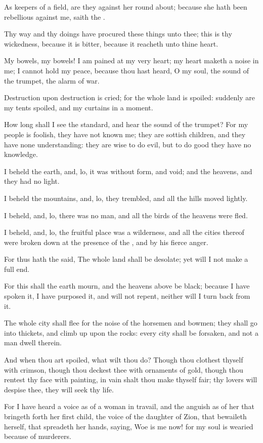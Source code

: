 \Verse As keepers of a field, are they against her round about; because she hath been rebellious against me, saith the \LORD.

\Verse Thy way and thy doings have procured these things unto thee; this is thy wickedness, because it is bitter, because it reacheth unto thine heart.

\Verse My bowels, my bowels! I am pained at my very heart; my heart maketh a noise in me; I cannot hold my peace, because thou hast heard, O my soul, the sound of the trumpet, the alarm of war.

\Verse Destruction upon destruction is cried; for the whole land is spoiled: suddenly are my tents spoiled, and my curtains in a moment.

\Verse How long shall I see the standard, and hear the sound of the trumpet?  \Verse For my people is foolish, they have not known me; they are sottish children, and they have none understanding: they are wise to do evil, but to do good they have no knowledge.

\Verse I beheld the earth, and, lo, it was without form, and void; and the heavens, and they had no light.

\Verse I beheld the mountains, and, lo, they trembled, and all the hills moved lightly.

\Verse I beheld, and, lo, there was no man, and all the birds of the heavens were fled.

\Verse I beheld, and, lo, the fruitful place was a wilderness, and all the cities thereof were broken down at the presence of the \LORD, and by his fierce anger.

\Verse For thus hath the \LORD said, The whole land shall be desolate; yet will I not make a full end.

\Verse For this shall the earth mourn, and the heavens above be black; because I have spoken it, I have purposed it, and will not repent, neither will I turn back from it.

\Verse The whole city shall flee for the noise of the horsemen and bowmen; they shall go into thickets, and climb up upon the rocks: every city shall be forsaken, and not a man dwell therein.

\Verse And when thou art spoiled, what wilt thou do? Though thou clothest thyself with crimson, though thou deckest thee with ornaments of gold, though thou rentest thy face with painting, in vain shalt thou make thyself fair; thy lovers will despise thee, they will seek thy life.

\Verse For I have heard a voice as of a woman in travail, and the anguish as of her that bringeth forth her first child, the voice of the daughter of Zion, that bewaileth herself, that spreadeth her hands, saying, Woe is me now! for my soul is wearied because of murderers.



